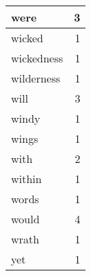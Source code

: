 \begin{center}
\begin{longtable}{l|r}
were & 3 \\ \hline
wicked & 1 \\ \hline
wickedness & 1 \\ \hline
wilderness & 1 \\ \hline
will & 3 \\ \hline
windy & 1 \\ \hline
wings & 1 \\ \hline
with & 2 \\ \hline
within & 1 \\ \hline
words & 1 \\ \hline
would & 4 \\ \hline
wrath & 1 \\ \hline
yet & 1 \\ \hline
\end{longtable}
\end{center}



\normalsize



